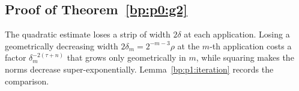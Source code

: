 
\subsection{Proof of Theorem~\ref{bp:p0:g2}}\label{bp:p3:proof-section}

The quadratic estimate loses a strip of width $2\delta$ at each application. Losing a geometrically
decreasing width $2\delta_m=2^{-m-3}\rho$ at the $m$-th application costs a factor
$\delta_m^{-2(\tau+n)}$ that grows only geometrically in $m$, while squaring makes the norms decrease
super-exponentially. Lemma~\ref{bp:p1:iteration} records the comparison.

